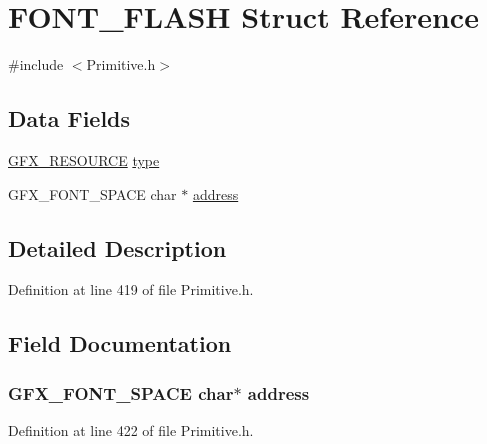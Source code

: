 \hypertarget{struct_f_o_n_t___f_l_a_s_h}{}\section{F\+O\+N\+T\+\_\+\+F\+L\+A\+S\+H Struct Reference}
\label{struct_f_o_n_t___f_l_a_s_h}


{\ttfamily \#include $<$Primitive.\+h$>$}

\subsection*{Data Fields}
\begin{DoxyCompactItemize}
\item 
\hyperlink{_primitive_8h_a9a3785e6345a6e01071a873d03698baf}{G\+F\+X\+\_\+\+R\+E\+S\+O\+U\+R\+C\+E} \hyperlink{struct_f_o_n_t___f_l_a_s_h_ad19c8e0d19c638be9dd81d163454b0f1}{type}
\item 
G\+F\+X\+\_\+\+F\+O\+N\+T\+\_\+\+S\+P\+A\+C\+E char $\ast$ \hyperlink{struct_f_o_n_t___f_l_a_s_h_ad92fcf3ffaeebad2d7014aecad57a1b3}{address}
\end{DoxyCompactItemize}


\subsection{Detailed Description}


Definition at line 419 of file Primitive.\+h.



\subsection{Field Documentation}
\hypertarget{struct_f_o_n_t___f_l_a_s_h_ad92fcf3ffaeebad2d7014aecad57a1b3}{}
\subsubsection[{address}]{\setlength{\rightskip}{0pt plus 5cm}G\+F\+X\+\_\+\+F\+O\+N\+T\+\_\+\+S\+P\+A\+C\+E char$\ast$ address}\label{struct_f_o_n_t___f_l_a_s_h_ad92fcf3ffaeebad2d7014aecad57a1b3}


Definition at line 422 of file Primitive.\+h.

\hypertarget{struct_f_o_n_t___f_l_a_s_h_ad19c8e0d19c638be9dd81d163454b0f1}{}
